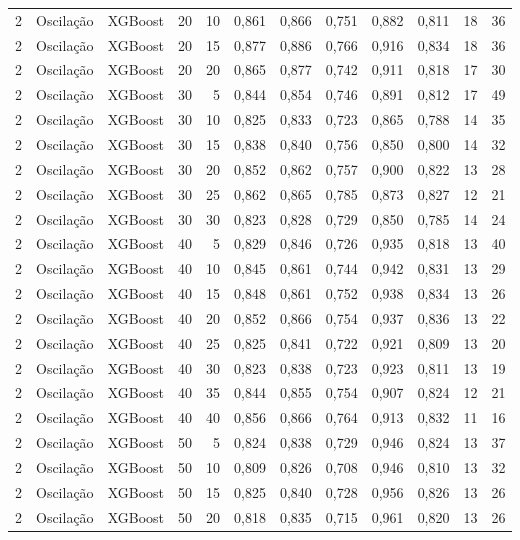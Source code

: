 \begin{longtable}{@{}rllrrrrrrrrr@{}}
2 & Oscilação & XGBoost & 20 & 10 & 0,861 & 0,866 & 0,751 & 0,882 & 0,811 & 18 & 36 \\
2 & Oscilação & XGBoost & 20 & 15 & 0,877 & 0,886 & 0,766 & 0,916 & 0,834 & 18 & 36 \\
2 & Oscilação & XGBoost & 20 & 20 & 0,865 & 0,877 & 0,742 & 0,911 & 0,818 & 17 & 30 \\
2 & Oscilação & XGBoost & 30 & 5 & 0,844 & 0,854 & 0,746 & 0,891 & 0,812 & 17 & 49 \\
2 & Oscilação & XGBoost & 30 & 10 & 0,825 & 0,833 & 0,723 & 0,865 & 0,788 & 14 & 35 \\
2 & Oscilação & XGBoost & 30 & 15 & 0,838 & 0,840 & 0,756 & 0,850 & 0,800 & 14 & 32 \\
2 & Oscilação & XGBoost & 30 & 20 & 0,852 & 0,862 & 0,757 & 0,900 & 0,822 & 13 & 28 \\
2 & Oscilação & XGBoost & 30 & 25 & 0,862 & 0,865 & 0,785 & 0,873 & 0,827 & 12 & 21 \\
2 & Oscilação & XGBoost & 30 & 30 & 0,823 & 0,828 & 0,729 & 0,850 & 0,785 & 14 & 24 \\
2 & Oscilação & XGBoost & 40 & 5 & 0,829 & 0,846 & 0,726 & 0,935 & 0,818 & 13 & 40 \\
2 & Oscilação & XGBoost & 40 & 10 & 0,845 & 0,861 & 0,744 & 0,942 & 0,831 & 13 & 29 \\
2 & Oscilação & XGBoost & 40 & 15 & 0,848 & 0,861 & 0,752 & 0,938 & 0,834 & 13 & 26 \\
2 & Oscilação & XGBoost & 40 & 20 & 0,852 & 0,866 & 0,754 & 0,937 & 0,836 & 13 & 22 \\
2 & Oscilação & XGBoost & 40 & 25 & 0,825 & 0,841 & 0,722 & 0,921 & 0,809 & 13 & 20 \\
2 & Oscilação & XGBoost & 40 & 30 & 0,823 & 0,838 & 0,723 & 0,923 & 0,811 & 13 & 19 \\
2 & Oscilação & XGBoost & 40 & 35 & 0,844 & 0,855 & 0,754 & 0,907 & 0,824 & 12 & 21 \\
2 & Oscilação & XGBoost & 40 & 40 & 0,856 & 0,866 & 0,764 & 0,913 & 0,832 & 11 & 16 \\
2 & Oscilação & XGBoost & 50 & 5 & 0,824 & 0,838 & 0,729 & 0,946 & 0,824 & 13 & 37 \\
2 & Oscilação & XGBoost & 50 & 10 & 0,809 & 0,826 & 0,708 & 0,946 & 0,810 & 13 & 32 \\
2 & Oscilação & XGBoost & 50 & 15 & 0,825 & 0,840 & 0,728 & 0,956 & 0,826 & 13 & 26 \\
2 & Oscilação & XGBoost & 50 & 20 & 0,818 & 0,835 & 0,715 & 0,961 & 0,820 & 13 & 26 \\

\end{longtable}
